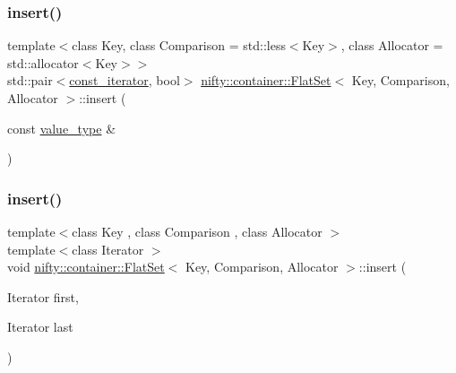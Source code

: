 \mbox{\label{classnifty_1_1container_1_1FlatSet_a3e59cfe8b3d5eb53750ef761cce7b652}} 
\subsubsection{\texorpdfstring{insert()}{insert()}\hspace{0.1cm}{\footnotesize\ttfamily [1/3]}}
{\footnotesize\ttfamily template$<$class Key, class Comparison = std\+::less$<$\+Key$>$, class Allocator = std\+::allocator$<$\+Key$>$$>$ \\
std\+::pair$<$\hyperlink{classnifty_1_1container_1_1FlatSet_a0f4cd26da060859b18742abfd534aa24}{const\+\_\+iterator}, bool$>$ \hyperlink{classnifty_1_1container_1_1FlatSet}{nifty\+::container\+::\+Flat\+Set}$<$ Key, Comparison, Allocator $>$\+::insert (\begin{DoxyParamCaption}\item[{const \hyperlink{classnifty_1_1container_1_1FlatSet_a2366c665ec49d585ff8a77362468d82d}{value\+\_\+type} \&}]{ }\end{DoxyParamCaption})}

\mbox{\label{classnifty_1_1container_1_1FlatSet_a2681201810070decb9eeb7f5beb47f0d}} 
\subsubsection{\texorpdfstring{insert()}{insert()}\hspace{0.1cm}{\footnotesize\ttfamily [2/3]}}
{\footnotesize\ttfamily template$<$class Key , class Comparison , class Allocator $>$ \\
template$<$class Iterator $>$ \\
void \hyperlink{classnifty_1_1container_1_1FlatSet}{nifty\+::container\+::\+Flat\+Set}$<$ Key, Comparison, Allocator $>$\+::insert (\begin{DoxyParamCaption}\item[{Iterator}]{first,  }\item[{Iterator}]{last }\end{DoxyParamCaption})\hspace{0.3cm}{\ttfamily [inline]}}

